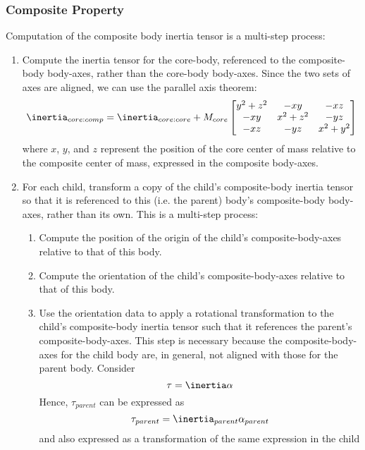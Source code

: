 \subsubsection {Composite Property}
Computation of the composite body inertia tensor is a multi-step process:
\begin{enumerate}
 \item Compute the inertia tensor for the core-body, referenced to the
 composite-body body-axes, rather than the core-body body-axes.  Since the two
 sets of axes are aligned, we can use the parallel axis theorem:
 \begin{equation}\label{eq:inertia_offset}
  \inertia_{core:comp} = \inertia_{core:core} + M_{core} \begin{bmatrix} y^2 +
  z^2 & -xy & -xz \\-xy & x^2 + z^2 & -yz \\ -xz & -yz & x^2+y^2 \end{bmatrix}
 \end{equation}
 where $x$, $y$, and $z$ represent the position of the core center of mass
 relative to the composite center of mass, expressed in the composite
 body-axes.
 \item For each child, transform a copy of the child's composite-body inertia
 tensor so that it is referenced to this (i.e. the parent) body's
 composite-body body-axes, rather than its own.  This is a multi-step process:
 \begin{enumerate}
  \item Compute the position of the origin of the child's composite-body-axes
  relative to that of this body.
  \item Compute the orientation of the child's composite-body-axes relative to
  that of this body.
  \item Use the orientation data to apply a rotational transformation to the
  child's composite-body inertia tensor such that it references the parent's
  composite-body-axes.  This step is necessary because the composite-body-axes
  for the child body are, in general, not aligned with those for the parent
  body. Consider
  \begin{equation*}
   \tau = \inertia \alpha
  \end{equation*}
  Hence, $\tau_{parent}$ can be expressed as
  \begin{equation*}
   \tau_{parent} = \inertia_{parent} \alpha_{parent}
  \end{equation*}
  and also expressed as a transformation of the same expression in the child

\end{enumerate}
\end{enumerate}
